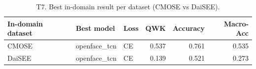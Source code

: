 \begin{table}
\caption{T7. Best in-domain result per dataset (CMOSE vs DaiSEE).}
\label{tab:T7_indomain_datasets}
\begin{tabular}{lllrrr}
\toprule
In-domain dataset & Best model & Loss & QWK & Accuracy & Macro-Acc \\
\midrule
CMOSE & openface_tcn & CE & 0.537 & 0.761 & 0.535 \\
DaiSEE & openface_tcn & CE & 0.139 & 0.521 & 0.273 \\
\bottomrule
\end{tabular}
\end{table}
